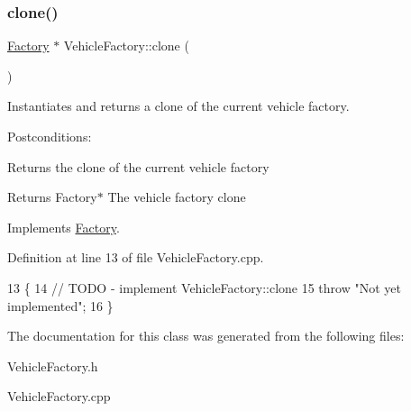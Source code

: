 \subsubsection{\texorpdfstring{clone()}{clone()}}
{\footnotesize\ttfamily \hyperlink{classFactory}{Factory} $\ast$ Vehicle\+Factory\+::clone (\begin{DoxyParamCaption}{ }\end{DoxyParamCaption})\hspace{0.3cm}{\ttfamily [virtual]}}



Instantiates and returns a clone of the current vehicle factory. 

Postconditions\+:
\begin{DoxyItemize}
\item Returns the clone of the current vehicle factory
\end{DoxyItemize}

\begin{DoxyReturn}{Returns}
Factory$\ast$ The vehicle factory clone 
\end{DoxyReturn}


Implements \hyperlink{classFactory_a00881ec5050751e4b747db5dfd266192}{Factory}.



Definition at line 13 of file Vehicle\+Factory.\+cpp.


\begin{DoxyCode}
13                                \{
14     \textcolor{comment}{// TODO - implement VehicleFactory::clone}
15     \textcolor{keywordflow}{throw} \textcolor{stringliteral}{"Not yet implemented"};
16 \}
\end{DoxyCode}


The documentation for this class was generated from the following files\+:\begin{DoxyCompactItemize}
\item 
Vehicle\+Factory.\+h\item 
Vehicle\+Factory.\+cpp\end{DoxyCompactItemize}
